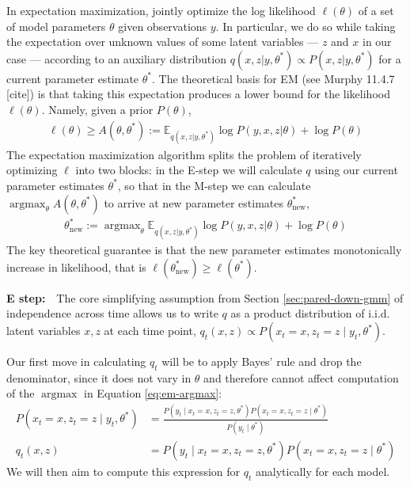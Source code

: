 \documentclass{article}         %
\DeclareMathOperator{\argmax}{\arg\max}
\newcommand{\EE}{\mathbb{E}}
\begin{document}
In expectation maximization, jointly optimize the log likelihood $\ell(\theta)$ of a set of model parameters $\theta$ given observations $y$. In particular, we do so while taking the expectation over unknown values of some latent variables --- $z$ and $x$ in our case --- according to an auxiliary distribution $q(x, z | y, \theta^*) \propto P(x, z | y, \theta^*)$ for a current parameter estimate $\theta^*$. The theoretical basis for EM (see Murphy 11.4.7 [cite]) is that taking this expectation produces a lower bound for the likelihood $\ell(\theta)$. Namely, given a prior $P(\theta)$,
\begin{align}
    \ell(\theta) \geq A(\theta, \theta^*) := \EE_{q(x, z | y, \theta^*)} \log P(y, x, z | \theta) + \log P(\theta)
\end{align}
The expectation maximization algorithm splits the problem of iteratively optimizing $\ell$ into two blocks: in the E-step we will calculate $q$ using our current parameter estimates $\theta^*$, so that in the M-step we can calculate $\argmax_\theta A(\theta, \theta^*)$ to arrive at new parameter estimates $\theta^*_{\text{new}}$,
\begin{align}
    \theta^*_{\text{new}} := \argmax_{\theta} \EE_{q(x, z | y, \theta^*)} \log P(y, x, z | \theta) + \log P(\theta)\label{eq:em-argmax}
\end{align}
The key theoretical guarantee is that the new parameter estimates monotonically increase in likelihood, that is $\ell(\theta^*_{\text{new}}) \geq \ell(\theta^*)$.



\textbf{E step:}\ \ The core simplifying assumption from Section \ref{sec:pared-down-gmm} of independence across time allows us to write $q$ as a product distribution of i.i.d. latent variables $x, z$ at each time point, $q_t(x, z) \propto P(x_t = x, z_t = z \mid y_t, \theta^*)$.

Our first move in calculating $q_t$ will be to apply Bayes' rule and drop the denominator, since it does not vary in $\theta$ and therefore cannot affect computation of the $\argmax$ in Equation \ref{eq:em-argmax}:
\begin{align}
    \label{eq:latent-posterior-bayes}
    P(x_t = x, z_t = z \mid y_t, \theta^*) &= \frac{P(y_t \mid x_t = x, z_t = z, \theta^*)P(x_t = x, z_t = z \mid \theta^*)}{P(y_t \mid \theta^*)} \\
    q_t(x, z) &= P(y_t \mid x_t = x, z_t = z, \theta^*)P(x_t = x, z_t = z \mid \theta^*) \label{eq:general-qt}
\end{align}
We will then aim to compute this expression for $q_t$ analytically for each model.
\end{document}
